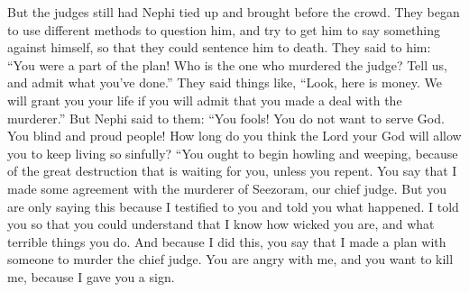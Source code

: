 But the judges still had Nephi tied up and brought before the crowd. They began to use different methods to question him, and try to get him to say something against himself, so that they could sentence him to death.
\bverse \iffalse Saying unto him: Thou art confederate; who is this man that hath done this murder? Now tell us, and acknowledge thy fault; saying, Behold here is money; and also we will grant unto thee thy life if thou wilt tell us, and acknowledge the agreement which thou hast made with him. \fi
They said to him: ``You were a part of the plan! Who is the one who murdered the judge? Tell us, and admit what you've done.'' They said things like, ``Look, here is money. We will grant you your life if you will admit that you made a deal with the murderer.''
\bverse \iffalse But Nephi said unto them: O ye fools, ye uncircumcised of heart, ye blind, and ye stiffnecked people, do ye know how long the Lord your God will suffer you that ye shall go on in this your way of sin? \fi
But Nephi said to them: ``You fools! You do not want to serve God. You blind and proud people! How long do you think the Lord your God will allow you to keep living so sinfully?
\bverse \iffalse O ye ought to begin to howl and mourn, because of the great destruction which at this time doth await you, except ye shall repent. \fi
``You ought to begin howling and weeping, because of the great destruction that is waiting for you, unless you repent.
\bverse \iffalse Behold ye say that I have agreed with a man that he should murder Seezoram, our chief judge. But behold, I say unto you, that this is because I have testified unto you that ye might know concerning this thing; yea, even for a witness unto you, that I did know of the wickedness and abominations which are among you. \fi
You say that I made some agreement with the murderer of Seezoram, our chief judge. But you are only saying this because I testified to you and told you what happened. I told you so that you could understand that I know how wicked you are, and what terrible things you do.
\bverse \iffalse And because I have done this, ye say that I have agreed with a man that he should do this thing; yea, because I showed unto you this sign ye are angry with me, and seek to destroy my life. \fi
And because I did this, you say that I made a plan with someone to murder the chief judge. You are angry with me, and you want to kill me, because I gave you a sign.
\bverse \iffalse And now behold, I will show unto you another sign, and see if ye will in this thing seek to destroy me. \fi
